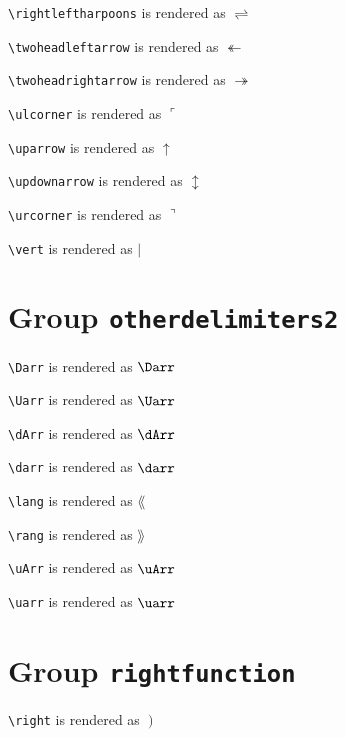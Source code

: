 \texttt{\textbackslash rightleftharpoons} is rendered as $\rightleftharpoons$

\texttt{\textbackslash twoheadleftarrow} is rendered as $\twoheadleftarrow$

\texttt{\textbackslash twoheadrightarrow} is rendered as $\twoheadrightarrow$

\texttt{\textbackslash ulcorner} is rendered as $\ulcorner$

\texttt{\textbackslash uparrow} is rendered as $\uparrow$

\texttt{\textbackslash updownarrow} is rendered as $\updownarrow$

\texttt{\textbackslash urcorner} is rendered as $\urcorner$

\texttt{\textbackslash vert} is rendered as $\vert$

\section{ Group \texttt{other\textunderscore delimiters2}}

\texttt{\textbackslash Darr} is rendered as $\Darr$

\texttt{\textbackslash Uarr} is rendered as $\Uarr$

\texttt{\textbackslash dArr} is rendered as $\dArr$

\texttt{\textbackslash darr} is rendered as $\darr$

\texttt{\textbackslash lang} is rendered as $\lang$

\texttt{\textbackslash rang} is rendered as $\rang$

\texttt{\textbackslash uArr} is rendered as $\uArr$

\texttt{\textbackslash uarr} is rendered as $\uarr$

\section{ Group \texttt{right\textunderscore function}}

\texttt{\textbackslash right} is rendered as $\left. \right)$